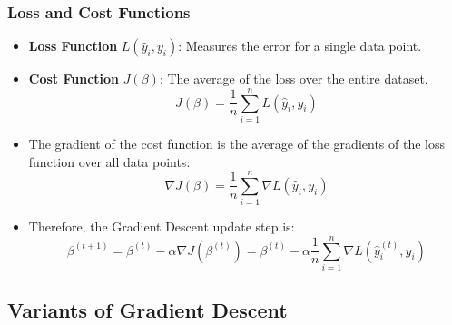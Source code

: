 \documentclass{article}
\begin{document}
\subsubsection{Loss and Cost Functions}

\begin{itemize}
    \item \textbf{Loss Function} $L(\hat{y}_i, y_i)$: Measures the error for a single data point.
    \item \textbf{Cost Function} $J(\beta)$: The average of the loss over the entire dataset.
    \[
    J(\beta) = \frac{1}{n} \sum_{i=1}^{n} L(\hat{y}_i, y_i)
    \]
    \item The gradient of the cost function is the average of the gradients of the loss function over all data points:
    \[
    \nabla J(\beta) = \frac{1}{n} \sum_{i=1}^{n} \nabla L(\hat{y}_i, y_i)
    \]
    \item Therefore, the Gradient Descent update step is:
    \[
    \beta^{(t+1)} = \beta^{(t)} - \alpha \nabla J(\beta^{(t)}) = \beta^{(t)} - \alpha \frac{1}{n} \sum_{i=1}^{n} \nabla L(\hat{y}_i^{(t)}, y_i)
    \]
\end{itemize}

\subsection{Variants of Gradient Descent}
\end{document}
